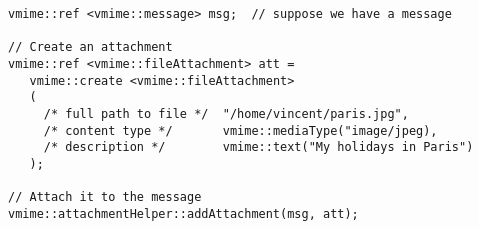 \begin{lstlisting}[caption={Adding an attachment to an existing message}]
vmime::ref <vmime::message> msg;  // suppose we have a message

// Create an attachment
vmime::ref <vmime::fileAttachment> att =
   vmime::create <vmime::fileAttachment>
   (
     /* full path to file */  "/home/vincent/paris.jpg",
     /* content type */       vmime::mediaType("image/jpeg),
     /* description */        vmime::text("My holidays in Paris")
   );

// Attach it to the message
vmime::attachmentHelper::addAttachment(msg, att);
\end{lstlisting}

